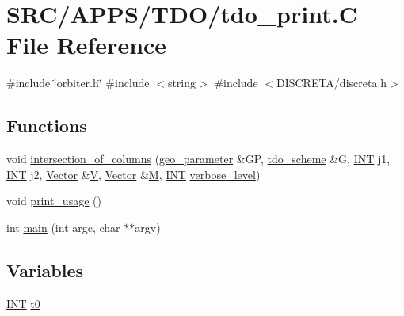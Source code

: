 \hypertarget{tdo__print_8_c}{}\section{S\+R\+C/\+A\+P\+P\+S/\+T\+D\+O/tdo\+\_\+print.C File Reference}
\label{tdo__print_8_c}
{\ttfamily \#include \char`\"{}orbiter.\+h\char`\"{}}\newline
{\ttfamily \#include $<$string$>$}\newline
{\ttfamily \#include $<$D\+I\+S\+C\+R\+E\+T\+A/discreta.\+h$>$}\newline
\subsection*{Functions}
\begin{DoxyCompactItemize}
\item 
void \mbox{\hyperlink{tdo__print_8_c_aace44bb8f2d51d1426d16a7023cc2aed}{intersection\+\_\+of\+\_\+columns}} (\mbox{\hyperlink{classgeo__parameter}{geo\+\_\+parameter}} \&GP, \mbox{\hyperlink{classtdo__scheme}{tdo\+\_\+scheme}} \&G, \mbox{\hyperlink{galois_8h_a09fddde158a3a20bd2dcadb609de11dc}{I\+NT}} j1, \mbox{\hyperlink{galois_8h_a09fddde158a3a20bd2dcadb609de11dc}{I\+NT}} j2, \mbox{\hyperlink{class_vector}{Vector}} \&\mbox{\hyperlink{srg_8_c_af40a326b23c68a27cebe60f16634a2cb}{V}}, \mbox{\hyperlink{class_vector}{Vector}} \&\mbox{\hyperlink{plane__search_8_c_ad2d23ebd03187a91edd45b1d5e496265}{M}}, \mbox{\hyperlink{galois_8h_a09fddde158a3a20bd2dcadb609de11dc}{I\+NT}} \mbox{\hyperlink{simeon_8_c_a818073fbcc2f439e7c56952f67386122}{verbose\+\_\+level}})
\item 
void \mbox{\hyperlink{tdo__print_8_c_ae5ad5cbeccaedc03a48d3c7eaa803e79}{print\+\_\+usage}} ()
\item 
int \mbox{\hyperlink{tdo__print_8_c_a3c04138a5bfe5d72780bb7e82a18e627}{main}} (int argc, char $\ast$$\ast$argv)
\end{DoxyCompactItemize}
\subsection*{Variables}
\begin{DoxyCompactItemize}
\item 
\mbox{\hyperlink{galois_8h_a09fddde158a3a20bd2dcadb609de11dc}{I\+NT}} \mbox{\hyperlink{tdo__print_8_c_a4268f4fe222ffb119218a0199f5e1904}{t0}}
\end{DoxyCompactItemize}


